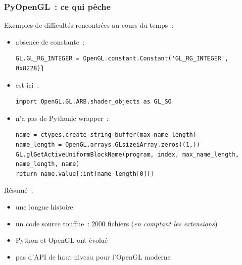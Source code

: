 \begin{frame}[fragile]
  \frametitle{PyOpenGL~: ce qui pêche}
  Exemples de difficultés rencontrées au cours du temps~:
    \begin{itemize}
    \item absence de constante~:%
      {\tiny\begin{verbatim}GL.GL_RG_INTEGER = OpenGL.constant.Constant('GL_RG_INTEGER', 0x8228)}\end{verbatim}}
    \item {} est ici~:%
      {\tiny\begin{verbatim}import OpenGL.GL.ARB.shader_objects as GL_SO\end{verbatim}}
    \item {} n'a pas de Pythonic wrapper~:
{\tiny%
\begin{verbatim}
name = ctypes.create_string_buffer(max_name_length)
name_length = OpenGL.arrays.GLsizeiArray.zeros((1,))
GL.glGetActiveUniformBlockName(program, index, max_name_length, name_length, name)
return name.value[:int(name_length[0])]
\end{verbatim}}
    \end{itemize}
    \vspace{1em}
    Résumé~:
    \begin{itemize}
    \item une longue histoire
    \item un code source touffue~: 2000 fichiers \small({\emph{en comptant les extensions})}
    \item Python et OpenGL ont évolué
    \item pas d'API de haut niveau pour l'OpenGL moderne %
    \end{itemize}
\end{frame}

